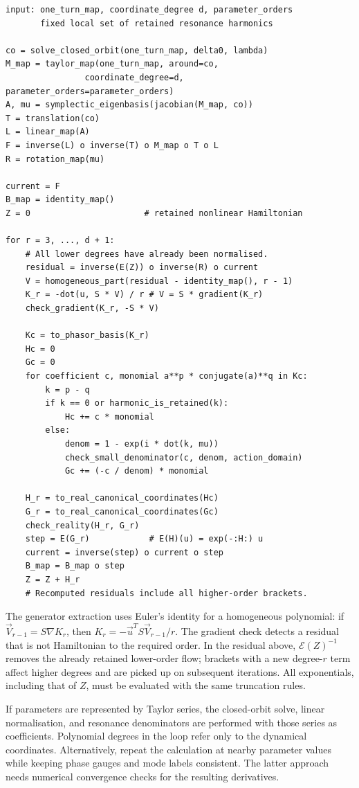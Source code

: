 \begin{lstlisting}[basicstyle=\ttfamily\small,columns=fullflexible,
                   keepspaces=true,frame=single]
input: one_turn_map, coordinate_degree d, parameter_orders
       fixed local set of retained resonance harmonics

co = solve_closed_orbit(one_turn_map, delta0, lambda)
M_map = taylor_map(one_turn_map, around=co,
                coordinate_degree=d, parameter_orders=parameter_orders)
A, mu = symplectic_eigenbasis(jacobian(M_map, co))
T = translation(co)
L = linear_map(A)
F = inverse(L) o inverse(T) o M_map o T o L
R = rotation_map(mu)

current = F
B_map = identity_map()
Z = 0                       # retained nonlinear Hamiltonian

for r = 3, ..., d + 1:
    # All lower degrees have already been normalised.
    residual = inverse(E(Z)) o inverse(R) o current
    V = homogeneous_part(residual - identity_map(), r - 1)
    K_r = -dot(u, S * V) / r # V = S * gradient(K_r)
    check_gradient(K_r, -S * V)

    Kc = to_phasor_basis(K_r)
    Hc = 0
    Gc = 0
    for coefficient c, monomial a**p * conjugate(a)**q in Kc:
        k = p - q
        if k == 0 or harmonic_is_retained(k):
            Hc += c * monomial
        else:
            denom = 1 - exp(i * dot(k, mu))
            check_small_denominator(c, denom, action_domain)
            Gc += (-c / denom) * monomial

    H_r = to_real_canonical_coordinates(Hc)
    G_r = to_real_canonical_coordinates(Gc)
    check_reality(H_r, G_r)
    step = E(G_r)            # E(H)(u) = exp(-:H:) u
    current = inverse(step) o current o step
    B_map = B_map o step
    Z = Z + H_r
    # Recomputed residuals include all higher-order brackets.
\end{lstlisting}

The generator extraction uses Euler's identity for a homogeneous
polynomial: if $\vec V_{r-1} = S\nabla K_r$, then
$K_r = -\vec u^TS\vec V_{r-1}/r$.  The gradient check detects a residual
that is not Hamiltonian to the required order.  In the residual above,
$\mathcal E(Z)^{-1}$ removes the already retained lower-order flow;
brackets with a new degree-$r$ term affect higher degrees and are picked
up on subsequent iterations.  All exponentials, including that of $Z$,
must be evaluated with the same truncation rules.

If parameters are represented by Taylor series, the closed-orbit solve,
linear normalisation, and resonance denominators are performed with those
series as coefficients.  Polynomial degrees in the loop refer only to
the dynamical coordinates.  Alternatively, repeat the calculation at
nearby parameter values while keeping phase gauges and mode labels
consistent.  The latter approach needs numerical convergence checks for
the resulting derivatives.

